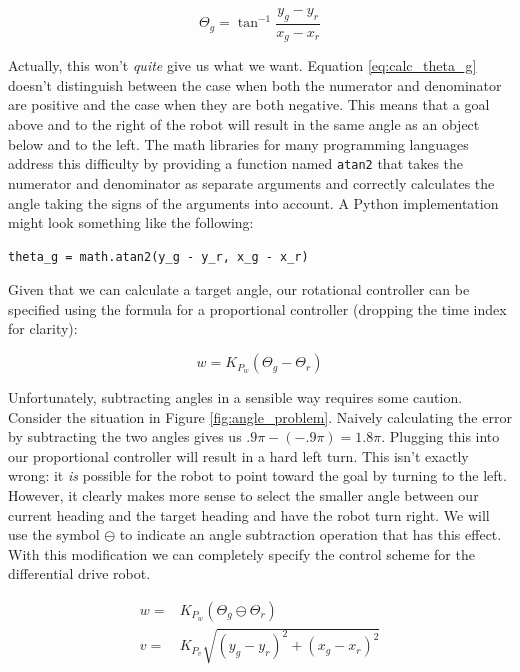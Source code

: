 \begin{equation}
\Theta_g = \tan^{-1}  \frac{y_g - y_r}{x_g - x_r}
\label{eq:calc_theta_g}
\end{equation} 

Actually, this won't \emph{quite} give us what we want.  Equation
\ref{eq:calc_theta_g} doesn't distinguish between the case when both
the numerator and denominator are positive and the case when they are
both negative.  This means that a goal above and to the right of the
robot will result in the same angle as an object below and to the
left.  The math libraries for many programming languages address this
difficulty by providing a function named \texttt{atan2} that takes the
numerator and denominator as separate arguments and correctly
calculates the angle taking the signs of the arguments into account.
A Python implementation might look something like the following:

\begin{center}
\begin{verbatim}
theta_g = math.atan2(y_g - y_r, x_g - x_r)
\end{verbatim}
\end{center}

Given that we can calculate a target angle, our rotational controller
can be specified using the formula for a proportional controller
(dropping the time index for clarity):


\begin{equation}
 w = K_{P_w} (\Theta_g - \Theta_r)
\end{equation}

Unfortunately, subtracting angles in a sensible way requires some
caution.  Consider the situation in Figure \ref{fig:angle_problem}.
Naively calculating the error by subtracting the two angles gives us
$.9 \pi - (-.9\pi) = 1.8\pi$.  Plugging this into our proportional
controller will result in a hard left turn.  This isn't exactly wrong:
it \emph{is} possible for the robot to point toward the goal by
turning to the left.  However, it clearly makes more sense to select
the smaller angle between our current heading and the target heading and
have the robot turn right.
We will use the symbol $\ominus$ to indicate an angle subtraction
operation that has this effect.  With this modification we can
completely specify the control scheme for the differential drive
robot.

\begin{align} 
 w =& K_{P_w} (\Theta_g \ominus \Theta_r) \label{eq:diff_rot}\\
 v =& K_{P_v} \sqrt{(y_g - y_r)^2 + (x_g - x_r)^2} \label{eq:diff_vel}
\end{align}


